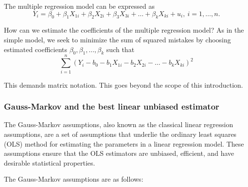 \documentclass[
  12pt,
  oneside]{book}
\theoremstyle{definition}
\theoremstyle{definition}
\theoremstyle{definition}
\theoremstyle{definition}
\theoremstyle{remark}
\begin{document}
The multiple regression model can be expressed as
\[
Y_i = \beta_0 + \beta_1 X_{1i} + \beta_2 X_{2i} + \beta_3 X_{3i} + \dots + \beta_k X_{ki} + u_i, \ i=1,\dots,n.
\]

How can we estimate the coefficients of the multiple regression model? As in the simple model, we seek to minimize the sum of squared mistakes by choosing estimated
coefficients \(\beta_0,\beta_1,\dots,\beta_k\) such that
\[\sum_{i=1}^n (Y_i - b_0 - b_1 X_{1i} - b_2 X_{2i} - \dots -  b_k X_{ki})^2 \]

This demands matrix notation. This goes beyond the scope of this introduction.

\hypertarget{gauss-markov-and-the-best-linear-unbiased-estimator}{%
\subsubsection{Gauss-Markov and the best linear unbiased estimator}\label{gauss-markov-and-the-best-linear-unbiased-estimator}}

The Gauss-Markov assumptions, also known as the classical linear regression assumptions, are a set of assumptions that underlie the ordinary least squares (OLS) method for estimating the parameters in a linear regression model. These assumptions ensure that the OLS estimators are unbiased, efficient, and have desirable statistical properties.

The Gauss-Markov assumptions are as follows:
\end{document}

